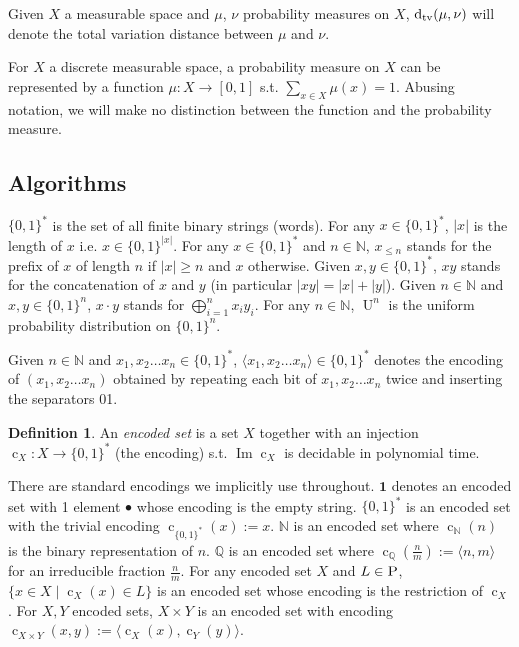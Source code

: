 \documentclass{article}
\numberwithin{equation}{section}
\theoremstyle{definition}
\newtheorem{definition}{Definition}[section]
\theoremstyle{plain}
\newcommand{\Words}{{\{ 0, 1 \}^*}}
\newcommand{\WordsLen}[1]{{\{ 0, 1 \}^{#1}}}
\DeclareMathOperator{\Img}{Im}
\DeclareMathOperator{\U}{U}
\DeclareMathOperator{\En}{c}
\newcommand{\Dtv}{\operatorname{d}_{\textnormal{tv}}}
\newcommand{\Nats}{\mathbb{N}}
\newcommand{\Rats}{\mathbb{Q}}
\newcommand{\Abs}[1]{\lvert #1 \rvert}
\newcommand{\Chev}[1]{\langle #1 \rangle}
\begin{document}
Given $X$ a measurable space and $\mu$, $\nu$ probability measures on $X$, $\Dtv(\mu,\nu)$ will denote the total variation distance between $\mu$ and $\nu$.

For $X$ a discrete measurable space, a probability measure on $X$ can be represented by a function $\mu: X \rightarrow [0,1]$ s.t. $\sum_{x \in X} \mu(x) = 1$. Abusing notation, we will make no distinction between the function and the probability measure.

\subsection{Algorithms}

$\Words$ is the set of all finite binary strings (words). For any $x \in \Words$, $\Abs{x}$ is the length of $x$ i.e. $x \in \WordsLen{\Abs{x}}$. For any $x \in \Words$ and $n \in \Nats$, $x_{\leq n}$ stands for the prefix of $x$ of length $n$ if $\Abs{x} \geq n$ and $x$ otherwise. Given $x,y \in \Words$, $xy$ stands for the concatenation of $x$ and $y$ (in particular $\Abs{xy}=\Abs{x}+\Abs{y}$). Given $n \in \Nats$ and $x,y \in \WordsLen{n}$, $x \cdot y$ stands for $\bigoplus_{i=1}^n x_i y_i$. For any $n \in \Nats$, $\U^n$ is the uniform probability distribution on $\WordsLen{n}$.

Given $n \in \Nats$ and ${x_1, x_2 \ldots x_n \in \Words}$, $\Chev{x_1,x_2 \ldots x_n} \in \Words$ denotes the encoding of $(x_1,x_2 \ldots x_n)$ obtained by repeating each bit of $x_1, x_2 \ldots x_n$ twice and inserting the separators 01.
\begin{definition}

An \emph{encoded set} is a set $X$ together with an injection ${\En_X: X \rightarrow \Words}$ (the encoding) s.t. $\Img \En_X$ is decidable in polynomial time.

\end{definition}

There are standard encodings we implicitly use throughout. $\bm{1}$ denotes an encoded set with 1 element $\bullet$ whose encoding is the empty string. $\Words$ is an encoded set with the trivial encoding ${\En_\Words(x):=x}$. $\Nats$ is an encoded set where $\En_\Nats(n)$ is the binary representation of $n$. $\Rats$ is an encoded set where ${\En_\Rats(\frac{n}{m}):=\Chev{n,m}}$ for an irreducible fraction $\frac{n}{m}$. For any encoded set $X$ and $L \in \textsc{P}$, $\{x \in X \mid \En_X(x) \in L\}$ is an encoded set whose encoding is the restriction of $\En_X$. For $X,Y$ encoded sets, $X \times Y$ is an encoded set with encoding $\En_{X \times Y}(x,y):=\Chev{\En_X(x),\En_Y(y)}$.
\end{document}
